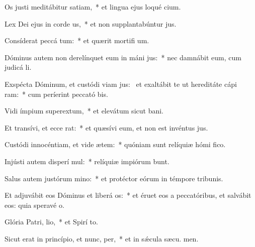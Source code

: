 \item Os justi meditábitur satiam,~* et lingua ejus loqué cium.
\item Lex Dei ejus in corde us,~* et non supplantabúntur  jus.
\item Consíderat peccá tum:~* et quærit mortifi um.
\item Dóminus autem non derelínquet eum in máni jus:~* nec damnábit eum, cum judicá li.
\item Exspécta Dóminum, et custódi viam jus:~\pscross{} et exaltábit te ut hereditáte cápi ram:~* cum períerint peccató bis.
\item Vidi ímpium superextum,~* et elevátum sicut  bani.
\item Et transívi, et ecce  rat:~* et quæsívi eum, et non est invéntus  jus.
\item Custódi innocéntiam, et vide ætem:~* quóniam sunt relíquiæ hómi fico.
\item Injústi autem disperí mul:~* relíquiæ impiórum bunt.
\item Salus autem justórum  mino:~* et protéctor eórum in témpore tribunis.
\item Et adjuvábit eos Dóminus et liberá os:~* et éruet eos a peccatóribus, et salvábit eos: quia speravé  o.
\item Glória Patri,  lio,~* et Spirí to.
\item Sicut erat in princípio, et nunc,  per,~* et in sǽcula sæcu. men.
